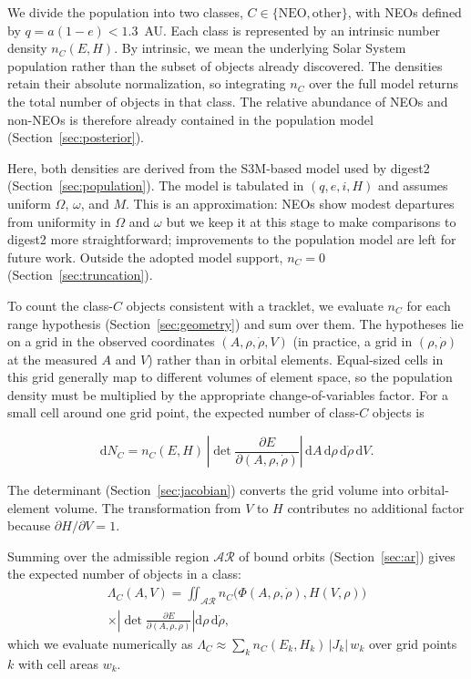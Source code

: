 \documentclass[linenumbers,twocolumn]{aastex701}
\newcommand{\dd}{\mathrm{d}}
\begin{document}
We divide the population into two classes,
$C\in\{\mathrm{NEO},\mathrm{other}\}$, with NEOs defined by
$q=a(1-e)<1.3$~AU. Each class is represented by an intrinsic number density
$n_C(E,H)$. By intrinsic, we mean the underlying Solar System population
rather than the subset of objects already discovered. The densities retain
their absolute normalization, so integrating $n_C$ over the full model
returns the total number of objects in that class. The relative abundance of
NEOs and non-NEOs is therefore already contained in the population model
(Section~\ref{sec:posterior}).

Here, both densities are derived from the S3M-based model used by digest2
(Section~\ref{sec:population}). The model is tabulated in $(q,e,i,H)$ and
assumes uniform $\Omega$, $\omega$, and $M$. This is an approximation:
NEOs show modest departures from uniformity in $\Omega$ and $\omega$
\citep{jeongahn2014} but we keep it at this stage to make comparisons to digest2 more straightforward; improvements to the population model are left
for future work. Outside the adopted model support, $n_C=0$ (Section~\ref{sec:truncation}).

To count the class-$C$ objects consistent with a tracklet, we evaluate
$n_C$ for each range hypothesis (Section~\ref{sec:geometry}) and sum over
them. The hypotheses lie on a grid in the observed coordinates
$(A,\rho,\dot\rho,V)$ (in practice, a grid in $(\rho,\dot\rho)$ at the
measured $A$ and $V$) rather than in orbital elements. Equal-sized cells in
this grid generally map to different volumes of element space, so the
population density must be multiplied by the appropriate change-of-variables
factor. For a small cell around one grid point, the expected number of
class-$C$ objects is

\begin{equation}
 \dd N_C = n_C(E,H)\,
\left|\det\frac{\partial E}{\partial(A,\rho,\dot\rho)}\right|\,
 \dd A\,\dd\rho\,\dd\dot\rho\,\dd V .
\label{eq:dN}
\end{equation}

The determinant (Section~\ref{sec:jacobian}) converts the grid volume into orbital-element
volume. The transformation from $V$ to $H$ contributes no additional factor
because $\partial H/\partial V=1$.

Summing over the admissible region $\mathcal{AR}$ of bound orbits
(Section~\ref{sec:ar}) gives the expected number of objects in a class:
\begin{multline}
\Lambda_C(A,V) = \iint_{\mathcal{AR}}
n_C\bigl(\Phi(A,\rho,\dot\rho),H(V,\rho)\bigr)\\
\times\left|\det\frac{\partial E}{\partial(A,\rho,\dot\rho)}\right|
\dd\rho\,\dd\dot\rho ,
\label{eq:lambda}
\end{multline}
which we evaluate numerically as
$\Lambda_C\approx\sum_k n_C(E_k,H_k)\,|J_k|\,w_k$ over grid points $k$ with
cell areas $w_k$.
\end{document}
